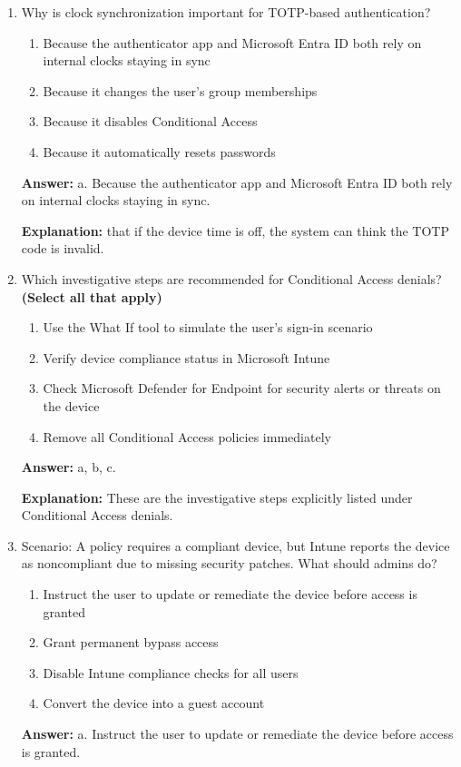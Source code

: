 \documentclass[10pt]{article}
\begin{document}
\begin{enumerate}[leftmargin=*]
\textbf{Explanation:} These are the resolution steps listed in the MFA troubleshooting scenario, while clock synchronization is also important rather than something to ignore.

\item Why is clock synchronization important for TOTP-based authentication?
\begin{enumerate}[label=\alph*., leftmargin=1.5em]
\item Because the authenticator app and Microsoft Entra ID both rely on internal clocks staying in sync
\item Because it changes the user’s group memberships
\item Because it disables Conditional Access
\item Because it automatically resets passwords
\end{enumerate}
\textbf{Answer:} a. Because the authenticator app and Microsoft Entra ID both rely on internal clocks staying in sync.

\textbf{Explanation:} that if the device time is off, the system can think the TOTP code is invalid.

\item Which investigative steps are recommended for Conditional Access denials? \textbf{(Select all that apply)}
\begin{enumerate}[label=\alph*., leftmargin=1.5em]
\item Use the What If tool to simulate the user’s sign-in scenario
\item Verify device compliance status in Microsoft Intune
\item Check Microsoft Defender for Endpoint for security alerts or threats on the device
\item Remove all Conditional Access policies immediately
\end{enumerate}
\textbf{Answer:} a, b, c.

\textbf{Explanation:} These are the investigative steps explicitly listed under Conditional Access denials.

\item Scenario: A policy requires a compliant device, but Intune reports the device as noncompliant due to missing security patches. What should admins do?
\begin{enumerate}[label=\alph*., leftmargin=1.5em]
\item Instruct the user to update or remediate the device before access is granted
\item Grant permanent bypass access
\item Disable Intune compliance checks for all users
\item Convert the device into a guest account
\end{enumerate}
\textbf{Answer:} a. Instruct the user to update or remediate the device before access is granted.


\end{enumerate}
\end{document}
